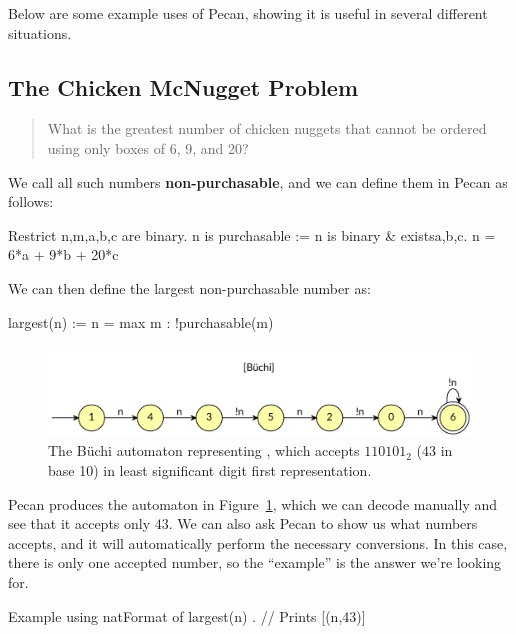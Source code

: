 \documentclass[a4paper,usenames,dvipsnames]{article}
\begin{document}
Below are some example uses of Pecan, showing it is useful in several different situations.

\subsection{The Chicken McNugget Problem}

\begin{quote}
    What is the greatest number of chicken nuggets that cannot be ordered using only boxes of 6, 9, and 20?
\end{quote}

We call all such numbers \textbf{non-purchasable}, and we can define them in Pecan as follows:

\begin{pecan}
Restrict n,m,a,b,c are binary.
n is purchasable := n is binary & existsa,b,c. n = 6*a + 9*b + 20*c
\end{pecan}

We can then define the largest non-purchasable number as:
\begin{pecan}
largest(n) := n = max { m : !purchasable(m) }
\end{pecan}

\begin{figure}
    \centering
    \includegraphics[width=\textwidth]{images/largest_not_purchasable.pdf}
    \caption{The B\"uchi automaton representing , which accepts $110101_2$ ($43$ in base 10) in least significant digit first representation.}
    \label{fig:largest_non_purchasable}
\end{figure}

Pecan produces the automaton in Figure~\ref{fig:largest_non_purchasable}, which we can decode manually and see that it accepts only $43$.
We can also ask Pecan to show us what numbers  accepts, and it will automatically perform the necessary conversions.
In this case, there is only one accepted number, so the ``example'' is the answer we're looking for.
\begin{pecan}
Example using natFormat of { largest(n) }. // Prints [(n,43)]
\end{pecan}
\end{document}
